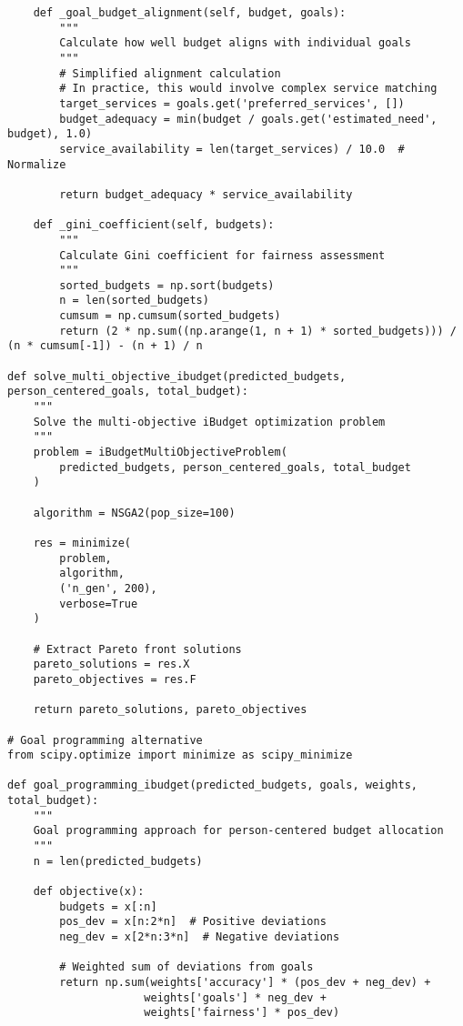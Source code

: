 \documentclass[12pt]{article}
\begin{document}
\begin{lstlisting}
    def _goal_budget_alignment(self, budget, goals):
        """
        Calculate how well budget aligns with individual goals
        """
        # Simplified alignment calculation
        # In practice, this would involve complex service matching
        target_services = goals.get('preferred_services', [])
        budget_adequacy = min(budget / goals.get('estimated_need', budget), 1.0)
        service_availability = len(target_services) / 10.0  # Normalize
        
        return budget_adequacy * service_availability
    
    def _gini_coefficient(self, budgets):
        """
        Calculate Gini coefficient for fairness assessment
        """
        sorted_budgets = np.sort(budgets)
        n = len(sorted_budgets)
        cumsum = np.cumsum(sorted_budgets)
        return (2 * np.sum((np.arange(1, n + 1) * sorted_budgets))) / (n * cumsum[-1]) - (n + 1) / n

def solve_multi_objective_ibudget(predicted_budgets, person_centered_goals, total_budget):
    """
    Solve the multi-objective iBudget optimization problem
    """
    problem = iBudgetMultiObjectiveProblem(
        predicted_budgets, person_centered_goals, total_budget
    )
    
    algorithm = NSGA2(pop_size=100)
    
    res = minimize(
        problem,
        algorithm,
        ('n_gen', 200),
        verbose=True
    )
    
    # Extract Pareto front solutions
    pareto_solutions = res.X
    pareto_objectives = res.F
    
    return pareto_solutions, pareto_objectives

# Goal programming alternative
from scipy.optimize import minimize as scipy_minimize

def goal_programming_ibudget(predicted_budgets, goals, weights, total_budget):
    """
    Goal programming approach for person-centered budget allocation
    """
    n = len(predicted_budgets)
    
    def objective(x):
        budgets = x[:n]
        pos_dev = x[n:2*n]  # Positive deviations
        neg_dev = x[2*n:3*n]  # Negative deviations
        
        # Weighted sum of deviations from goals
        return np.sum(weights['accuracy'] * (pos_dev + neg_dev) + 
                     weights['goals'] * neg_dev +
                     weights['fairness'] * pos_dev)
    

\end{lstlisting}
\end{document}
